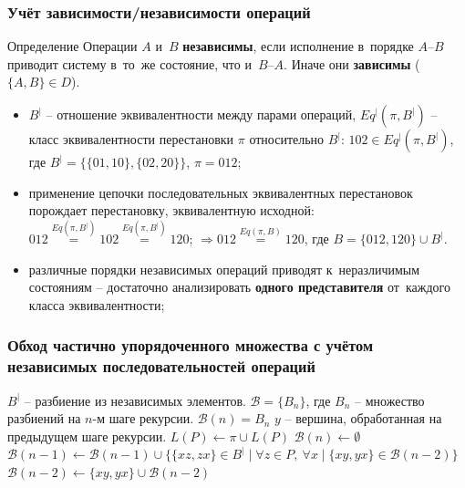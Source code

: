 \begin{frame}
  \frametitle{Учёт зависимости/независимости операций}
  \begin{block}{Определение}
    Операции $A$ и~$B$ \textbf{независимы}, если исполнение в~порядке
    $A$--$B$ приводит систему в~то~же состояние, что и~$B$--$A$.
    Иначе они \textbf{зависимы} ($\{A, B\} \in D$).
  \end{block}
  \begin{itemize}
    \item $B^{|}$ -- отношение эквивалентности между
      парами операций,
      $Eq^{|}(\pi, B^{|})$ -- класс эквивалентности перестановки
      $\pi$ относительно $B^{|}$: $102 \in
      Eq^{|}(\pi, B^{|})$, где $B^{|} = \{\{01, 10\}, \{02,
      20\}\}$, $\pi=012$;
    \item применение цепочки последовательных эквивалентных перестановок
      порождает перестановку, эквивалентную исходной:
      $012 \stackrel{Eq(\pi, B^{|})}{=} 102 \stackrel{Eq(\pi,
      B^{|})}{=} 120$; $\Rightarrow 012 \stackrel{Eq(\pi, B)}{=} 120$,
      где $B = \{012, 120\} \cup B^{|}$.
    \item различные порядки независимых операций приводят к~неразличимым
      состояниям -- достаточно анализировать \textbf{одного представителя}
      от~каждого класса эквивалентности;
  \end{itemize}
\end{frame}

\begin{frame}
  \frametitle{Обход частично упорядоченного множества с учётом
  независимых последовательностей операций}

  \label{alg:topo-indep-lookup}
  \begin{algorithmic}[1]
    \Require $B^{|}$ -- разбиение из независимых элементов.
    \Require $\mathcal{B} = \{B_n\}$, где $B_n$ -- множество
    разбиений на $n$-м шаге рекурсии. $\mathcal{B}(n) = B_n$
    \Require $y$ -- вершина, обработанная на предыдущем шаге рекурсии.
    \State $L(P) \gets \pi \cup L(P)$
    \EndIf
    \State $\mathcal{B}(n) \gets \emptyset$
    \State $\mathcal{B}(n-1) \gets \mathcal{B}(n-1) \cup \{\{xz,
      zx\} \in B^{|} \mid \forall z \in P,\ \forall x \mid \{xy, yx\}
    \in \mathcal{B}(n-2)\}$
    \label{alg:line:traverse}
    \State {}
    \State {}
    \State $\mathcal{B}(n-2) \gets \{xy, yx\} \cup \mathcal{B}(n-2)$
    \EndIf
    \EndFor
    \EndFunction
  \end{algorithmic}

\end{frame}

